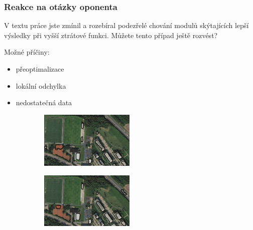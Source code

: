 \documentclass{beamer}
\begin{document}
\begin{frame}

\frametitle{Reakce na otázky oponenta}

V textu práce jste zmínil a rozebíral podezřelé chování modulů skýtajících lepší výsledky při vyšší ztrátové funkci. Můžete tento případ ještě rozvést?

\begin{center}
	\noindent\makebox[\linewidth]{\rule{0.9\textwidth}{0.4pt}}
\end{center}

\bigskip

Možné příčiny:
\begin{itemize}
	\item<2-> přeoptimalizace
	\item<3-> lokální odchylka
	\item<4-> nedostatečná data
\end{itemize}

\begin{figure}
	\centering
	\begin{minipage}{.45\textwidth}
		\centering
		\begin{figure}[ht]
	  		\includegraphics[width=4.5cm]{pictures/out_b_150.png}
		\end{figure}
    \end{minipage}%
    \begin{minipage}{.6\textwidth}
		\centering
		\begin{figure}[ht]
			\includegraphics[width=4.5cm]{pictures/out_b_180.png}
		\end{figure}
	\end{minipage}
\end{figure}

\end{frame}

\end{document}
